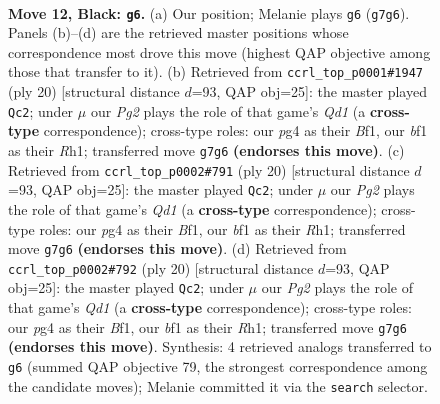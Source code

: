 \documentclass[11pt]{article}
\begin{document}
\clearpage

\begin{figure}[p]\centering
\begin{subfigure}{0.46\textwidth}\centering
\resizebox{\linewidth}{!}{%
\newchessgame
\chessboard[
  setfen={rnbq1rk1/pp1nb1pp/4p3/7P/P2P2P1/2N2N2/1P3P2/R1BQKB1R b KQ - 0 12},
  showmover=false,
  pgfstyle=straightmove, color=movearrow, markmove={g7-g6}
]}
\caption{}
\end{subfigure}\hfill
\begin{subfigure}{0.46\textwidth}\centering
\resizebox{\linewidth}{!}{%
\newchessgame
\chessboard[
  setfen={r1bqk2r/ppp2ppp/1n6/3p4/3P1B2/b1P5/P2NPPPP/1R1QKB1R w Kkq - 3 11},
  showmover=false,
  pgfstyle=straightmove, color=movearrow, markmove={d1-c2}
]}
\caption{}
\end{subfigure}
\\[4pt]
\begin{subfigure}{0.46\textwidth}\centering
\resizebox{\linewidth}{!}{%
\newchessgame
\chessboard[
  setfen={r1bqk2r/ppp2ppp/1n6/3p4/3P1B2/b1P5/P2NPPPP/1R1QKB1R w Kkq - 3 11},
  showmover=false,
  pgfstyle=straightmove, color=movearrow, markmove={d1-c2}
]}
\caption{}
\end{subfigure}\hfill
\begin{subfigure}{0.46\textwidth}\centering
\resizebox{\linewidth}{!}{%
\newchessgame
\chessboard[
  setfen={r1bqk2r/ppp2ppp/1n6/3p4/3P1B2/b1P5/P2NPPPP/1R1QKB1R w Kkq - 3 11},
  showmover=false,
  pgfstyle=straightmove, color=movearrow, markmove={d1-c2}
]}
\caption{}
\end{subfigure}
\caption{\textbf{Move 12, Black: \texttt{g6}.} (a) Our position; Melanie plays \texttt{g6} (\texttt{g7g6}). Panels (b)--(d) are the retrieved master positions whose correspondence most drove this move (highest QAP objective among those that transfer to it). (b) Retrieved from \texttt{ccrl\_top\_p0001\#1947} (ply 20) [structural distance $d$=93, QAP obj=25]: the master played \texttt{Qc2}; under $\mu$ our \emph{Pg2} plays the role of that game's \emph{Qd1} (a \textbf{cross-type} correspondence); cross-type roles: our \emph{p}g4 as their \emph{B}f1, our \emph{b}f1 as their \emph{R}h1; transferred move \texttt{g7g6} \textbf{(endorses this move)}. (c) Retrieved from \texttt{ccrl\_top\_p0002\#791} (ply 20) [structural distance $d$=93, QAP obj=25]: the master played \texttt{Qc2}; under $\mu$ our \emph{Pg2} plays the role of that game's \emph{Qd1} (a \textbf{cross-type} correspondence); cross-type roles: our \emph{p}g4 as their \emph{B}f1, our \emph{b}f1 as their \emph{R}h1; transferred move \texttt{g7g6} \textbf{(endorses this move)}. (d) Retrieved from \texttt{ccrl\_top\_p0002\#792} (ply 20) [structural distance $d$=93, QAP obj=25]: the master played \texttt{Qc2}; under $\mu$ our \emph{Pg2} plays the role of that game's \emph{Qd1} (a \textbf{cross-type} correspondence); cross-type roles: our \emph{p}g4 as their \emph{B}f1, our \emph{b}f1 as their \emph{R}h1; transferred move \texttt{g7g6} \textbf{(endorses this move)}. Synthesis: 4 retrieved analogs transferred to \texttt{g6} (summed QAP objective 79, the strongest correspondence among the candidate moves); Melanie committed it via the \texttt{search} selector.}
\label{fig:thought-m23}
\end{figure}
\end{document}
